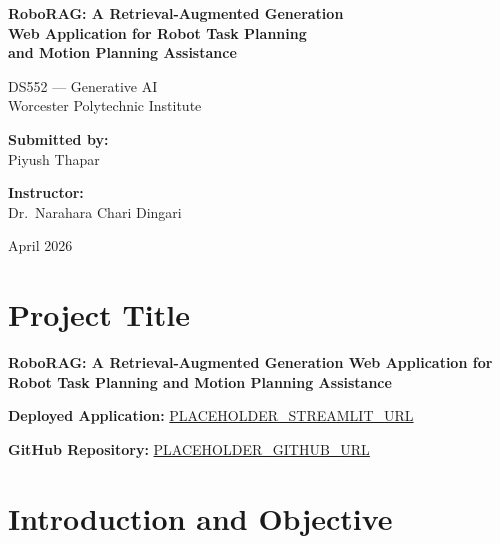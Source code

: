 \documentclass[12pt, a4paper]{article}
\begin{document}
\begin{titlepage}
\centering
\vspace*{2cm}

{\LARGE\bfseries RoboRAG: A Retrieval-Augmented Generation\\[4pt]
Web Application for Robot Task Planning\\[4pt]
and Motion Planning Assistance\par}

\vspace{1.5cm}
{\large DS552 --- Generative AI\\[6pt]
Worcester Polytechnic Institute\par}

\vspace{2cm}
{\large
\textbf{Submitted by:}\\[4pt]
Piyush Thapar\par}

\vspace{1cm}
{\large
\textbf{Instructor:}\\[4pt]
Dr.\ Narahara Chari Dingari\par}

\vspace{2cm}
{\large April 2026\par}

\vfill
\end{titlepage}

\tableofcontents
\newpage

\section{Project Title}

\textbf{RoboRAG: A Retrieval-Augmented Generation Web Application for Robot Task Planning and Motion Planning Assistance}

\textbf{Deployed Application:} \url{PLACEHOLDER_STREAMLIT_URL}

\textbf{GitHub Repository:} \url{PLACEHOLDER_GITHUB_URL}


\section{Introduction and Objective}
\end{document}
